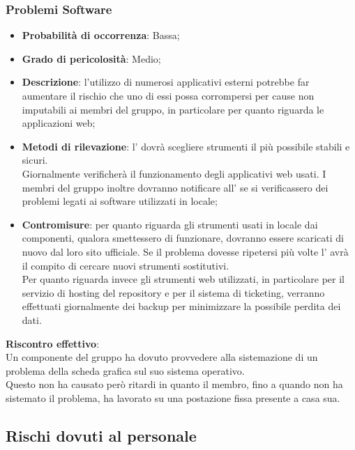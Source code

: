 		\subsubsection{Problemi Software} %
		\label{ssub:problemi_software}
			\begin{itemize}
				\item \textbf{Probabilità di occorrenza}: Bassa;
				\item \textbf{Grado di pericolosità}: Medio;
				\item \textbf{Descrizione}: l'utilizzo di numerosi applicativi esterni potrebbe far aumentare il rischio che uno di essi possa corrompersi per cause non imputabili ai membri del gruppo, in particolare per quanto riguarda le applicazioni web;
				\item \textbf{Metodi di rilevazione}: l'\roleAdministrator{} dovrà scegliere strumenti il più possibile stabili e sicuri. \\
				Giornalmente verificherà il funzionamento degli applicativi web usati. I membri del gruppo inoltre dovranno notificare all'\roleAdministrator{} se si verificassero dei problemi legati ai software utilizzati in locale;
				\item \textbf{Contromisure}: per quanto riguarda gli strumenti usati in locale dai componenti, qualora smettessero di funzionare, dovranno essere scaricati di nuovo dal loro sito ufficiale. Se il problema dovesse ripetersi più volte l'\roleAdministrator{} avrà il compito di cercare nuovi strumenti sostitutivi. \\
				Per quanto riguarda invece gli strumenti web utilizzati, in particolare per il servizio di hosting del repository e per il sistema di ticketing, verranno effettuati giornalmente dei backup per minimizzare la possibile perdita dei dati.
			\end{itemize}
		\noindent
		\textbf{Riscontro effettivo}: \\
		Un componente del gruppo ha dovuto provvedere alla sistemazione di un problema della scheda grafica sul suo sistema operativo. \\
		Questo non ha causato però ritardi in quanto il membro, fino a quando non ha sistemato il problema, ha lavorato su una postazione fissa presente a casa sua.
		
	
	\subsection{Rischi dovuti al personale} %
	\label{sub:rischi_dovuti_al_personale}
